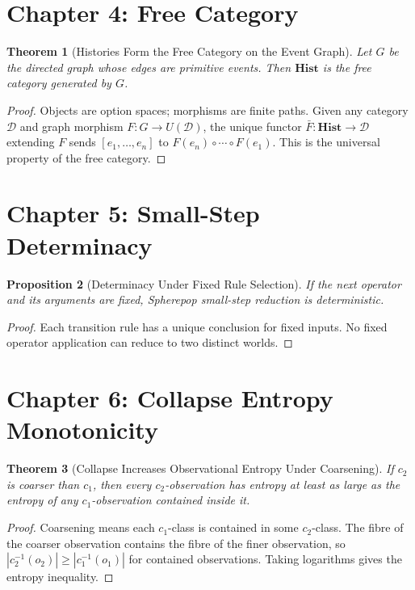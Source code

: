\documentclass[12pt, a4paper, openany]{book}
\theoremstyle{plain}
\newtheorem{theorem}{Theorem}[chapter]
\newtheorem{proposition}[theorem]{Proposition}
\theoremstyle{definition}
\theoremstyle{remark}
\newcommand{\Hist}{\mathbf{Hist}}
\begin{document}
\section{Chapter 4: Free Category}

\begin{theorem}[Histories Form the Free Category on the Event Graph]
Let $G$ be the directed graph whose edges are primitive events. Then $\Hist$ is
the free category generated by $G$.
\end{theorem}

\begin{proof}
Objects are option spaces; morphisms are finite paths. Given any category
$\mathcal{D}$ and graph morphism $F : G \to U(\mathcal{D})$, the unique functor
$\bar{F} : \Hist \to \mathcal{D}$ extending $F$ sends $[e_1, \ldots, e_n]$ to
$F(e_n) \circ \cdots \circ F(e_1)$. This is the universal property of the free
category.
\end{proof}

\section{Chapter 5: Small-Step Determinacy}

\begin{proposition}[Determinacy Under Fixed Rule Selection]
If the next operator and its arguments are fixed, Spherepop small-step reduction
is deterministic.
\end{proposition}

\begin{proof}
Each transition rule has a unique conclusion for fixed inputs. No fixed operator
application can reduce to two distinct worlds.
\end{proof}

\section{Chapter 6: Collapse Entropy Monotonicity}

\begin{theorem}[Collapse Increases Observational Entropy Under Coarsening]
If $c_2$ is coarser than $c_1$, then every $c_2$-observation has entropy at
least as large as the entropy of any $c_1$-observation contained inside it.
\end{theorem}

\begin{proof}
Coarsening means each $c_1$-class is contained in some $c_2$-class. The fibre
of the coarser observation contains the fibre of the finer observation, so
$|c_2^{-1}(o_2)| \geq |c_1^{-1}(o_1)|$ for contained observations. Taking
logarithms gives the entropy inequality.
\end{proof}
\end{document}
